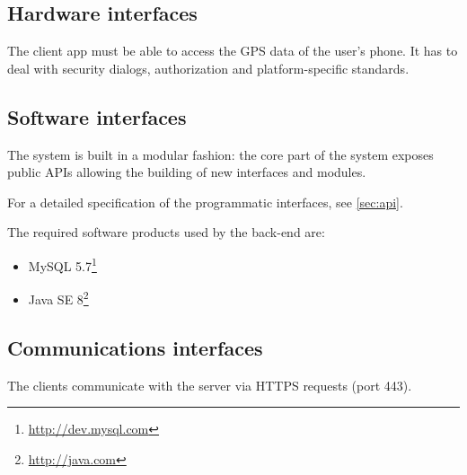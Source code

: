 \subsection{Hardware interfaces}

The client app must be able to access the GPS data of the user's phone.
It has to deal with security dialogs, authorization and platform-specific standards.

\subsection{Software interfaces}
The system is built in a modular fashion: the core part of the system exposes public APIs allowing the building of new interfaces and modules.

For a detailed specification of the programmatic interfaces, see \autoref{sec:api}.

The required software products used by the back-end are:
\begin{itemize}
\item MySQL 5.7\footnote{\url{http://dev.mysql.com}}
\item Java SE 8\footnote{\url{http://java.com}}
\end{itemize}

\subsection{Communications interfaces}
The clients communicate with the server via HTTPS requests (port 443).
